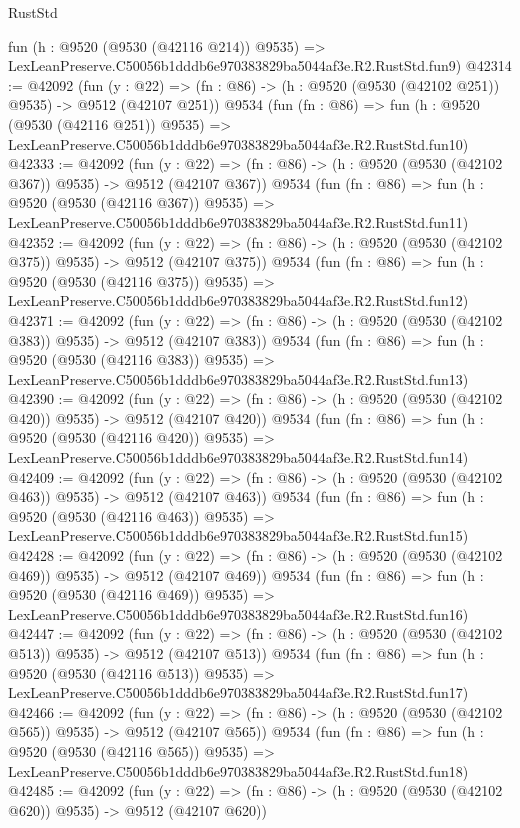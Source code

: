 \begin{lexlean}{RustStd}
\begin{coremodule}
    fun (h : @9520 (@9530 (@42116 @214)) @9535) =>
    LexLeanPreserve.C50056b1dddb6e970383829ba5044af3e.R2.RustStd.fun9)
@42314 := @42092
    (fun (y : @22) => (fn : @86) -> (h : @9520 (@9530 (@42102 @251)) @9535) -> @9512 (@42107 @251))
    @9534
    (fun (fn : @86) =>
    fun (h : @9520 (@9530 (@42116 @251)) @9535) =>
    LexLeanPreserve.C50056b1dddb6e970383829ba5044af3e.R2.RustStd.fun10)
@42333 := @42092
    (fun (y : @22) => (fn : @86) -> (h : @9520 (@9530 (@42102 @367)) @9535) -> @9512 (@42107 @367))
    @9534
    (fun (fn : @86) =>
    fun (h : @9520 (@9530 (@42116 @367)) @9535) =>
    LexLeanPreserve.C50056b1dddb6e970383829ba5044af3e.R2.RustStd.fun11)
@42352 := @42092
    (fun (y : @22) => (fn : @86) -> (h : @9520 (@9530 (@42102 @375)) @9535) -> @9512 (@42107 @375))
    @9534
    (fun (fn : @86) =>
    fun (h : @9520 (@9530 (@42116 @375)) @9535) =>
    LexLeanPreserve.C50056b1dddb6e970383829ba5044af3e.R2.RustStd.fun12)
@42371 := @42092
    (fun (y : @22) => (fn : @86) -> (h : @9520 (@9530 (@42102 @383)) @9535) -> @9512 (@42107 @383))
    @9534
    (fun (fn : @86) =>
    fun (h : @9520 (@9530 (@42116 @383)) @9535) =>
    LexLeanPreserve.C50056b1dddb6e970383829ba5044af3e.R2.RustStd.fun13)
@42390 := @42092
    (fun (y : @22) => (fn : @86) -> (h : @9520 (@9530 (@42102 @420)) @9535) -> @9512 (@42107 @420))
    @9534
    (fun (fn : @86) =>
    fun (h : @9520 (@9530 (@42116 @420)) @9535) =>
    LexLeanPreserve.C50056b1dddb6e970383829ba5044af3e.R2.RustStd.fun14)
@42409 := @42092
    (fun (y : @22) => (fn : @86) -> (h : @9520 (@9530 (@42102 @463)) @9535) -> @9512 (@42107 @463))
    @9534
    (fun (fn : @86) =>
    fun (h : @9520 (@9530 (@42116 @463)) @9535) =>
    LexLeanPreserve.C50056b1dddb6e970383829ba5044af3e.R2.RustStd.fun15)
@42428 := @42092
    (fun (y : @22) => (fn : @86) -> (h : @9520 (@9530 (@42102 @469)) @9535) -> @9512 (@42107 @469))
    @9534
    (fun (fn : @86) =>
    fun (h : @9520 (@9530 (@42116 @469)) @9535) =>
    LexLeanPreserve.C50056b1dddb6e970383829ba5044af3e.R2.RustStd.fun16)
@42447 := @42092
    (fun (y : @22) => (fn : @86) -> (h : @9520 (@9530 (@42102 @513)) @9535) -> @9512 (@42107 @513))
    @9534
    (fun (fn : @86) =>
    fun (h : @9520 (@9530 (@42116 @513)) @9535) =>
    LexLeanPreserve.C50056b1dddb6e970383829ba5044af3e.R2.RustStd.fun17)
@42466 := @42092
    (fun (y : @22) => (fn : @86) -> (h : @9520 (@9530 (@42102 @565)) @9535) -> @9512 (@42107 @565))
    @9534
    (fun (fn : @86) =>
    fun (h : @9520 (@9530 (@42116 @565)) @9535) =>
    LexLeanPreserve.C50056b1dddb6e970383829ba5044af3e.R2.RustStd.fun18)
@42485 := @42092
    (fun (y : @22) => (fn : @86) -> (h : @9520 (@9530 (@42102 @620)) @9535) -> @9512 (@42107 @620))

\end{coremodule}
\end{lexlean}
